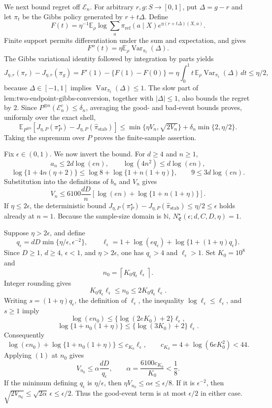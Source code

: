 We next bound regret off \(\mathcal E_n\). For arbitrary \(r,g:S\to[0,1]\), put \(\Delta=g-r\) and let \(\pi_t\) be the Gibbs policy generated by \(r+t\Delta\). Define
\[
F(t)=\eta^{-1}\mathbb E_\rho\log\sum_a\pi_{\mathrm{ref}}(a\mid X)e^{\eta(r+t\Delta)(X,a)}.
\]
Finite support permits differentiation under the sum and expectation, and gives
\[
F''(t)=\eta\mathbb E_\rho\operatorname{Var}_{\pi_t}(\Delta).
\]
The Gibbs variational identity followed by integration by parts yields
\[
J_{\eta,r}(\pi_r)-J_{\eta,r}(\pi_g)
=F'(1)-\{F(1)-F(0)\}
=\eta\int_0^1t\,\mathbb E_\rho\operatorname{Var}_{\pi_t}(\Delta)\,dt
\le\eta/2,
\]
because \(\Delta\in[-1,1]\) implies \(\operatorname{Var}_{\pi_t}(\Delta)\le1\). The slow part of \(\text{lem:two-endpoint-gibbs-conversion}\), together with \(|\Delta|\le1\), also bounds the regret by \(2\). Since \(P^{\otimes n}(\mathcal E_n^c)\le\delta_n\), averaging the good- and bad-event bounds proves, uniformly over the exact shell,
\[
\mathbb E_{P^{\otimes n}}\left[J_{\eta,P}(\pi_P^\star)-J_{\eta,P}(\widehat\pi_{\mathrm{stab}})\right]
\le\min\{\eta V_n,\sqrt{2V_n}\}
+\delta_n\min\{2,\eta/2\}.
\]
Taking the supremum over \(P\) proves the finite-sample assertion.

Fix \(\epsilon\in(0,1)\). We now invert the bound. For \(d\ge4\) and \(n\ge1\),
\[
a_n\le2d\log(en),
\qquad
\log(4n^2)\le d\log(en),
\]
\[
\log\{1+4n(\eta+2)\}
\le\log8+\log\{1+n(1+\eta)\},
\qquad
9\le3d\log(en).
\]
Substitution into the definitions of \(b_n\) and \(V_n\) gives
\[
V_n
\le6100\frac{dD}{n}
\left[\log(en)+\log\{1+n(1+\eta)\}\right].
\tag{1}
\]
If \(\eta\le2\epsilon\), the deterministic bound \(J_{\eta,P}(\pi_P^\star)-J_{\eta,P}(\widehat\pi_{\mathrm{stab}})\le\eta/2\le\epsilon\) holds already at \(n=1\). Because the sample-size domain is \(\mathbb N\), \(N^\star_{\mathfrak E}(\epsilon;d,C,D,\eta)=1\).

Suppose \(\eta>2\epsilon\), and define
\[
q_\epsilon=dD\min\{\eta/\epsilon,\epsilon^{-2}\},
\qquad
\ell_\epsilon=1+\log(eq_\epsilon)+\log\{1+(1+\eta)q_\epsilon\}.
\]
Since \(D\ge1\), \(d\ge4\), \(\epsilon<1\), and \(\eta>2\epsilon\), one has \(q_\epsilon>4\) and \(\ell_\epsilon>1\). Set \(K_0=10^8\) and
\[
n_0=\left\lceil K_0q_\epsilon\ell_\epsilon\right\rceil.
\]
Integer rounding gives
\[
K_0q_\epsilon\ell_\epsilon\le n_0\le2K_0q_\epsilon\ell_\epsilon.
\]
Writing \(s=(1+\eta)q_\epsilon\), the definition of \(\ell_\epsilon\), the inequality \(\log\ell_\epsilon\le\ell_\epsilon\), and \(s\ge1\) imply
\[
\log(en_0)\le\{\log(2eK_0)+2\}\ell_\epsilon,
\]
\[
\log\{1+n_0(1+\eta)\}
\le\{\log(3K_0)+2\}\ell_\epsilon.
\]
Consequently
\[
\log(en_0)+\log\{1+n_0(1+\eta)\}
\le c_{K_0}\ell_\epsilon,
\qquad
c_{K_0}=4+\log(6eK_0^2)<44.
\]
Applying \((1)\) at \(n_0\) gives
\[
V_{n_0}\le\alpha\frac{dD}{q_\epsilon},
\qquad
\alpha=\frac{6100c_{K_0}}{K_0}<\frac18.
\]
If the minimum defining \(q_\epsilon\) is \(\eta/\epsilon\), then \(\eta V_{n_0}\le\alpha\epsilon\le\epsilon/8\). If it is \(\epsilon^{-2}\), then \(\sqrt{2V_{n_0}}\le\sqrt{2\alpha}\,\epsilon\le\epsilon/2\). Thus the good-event term is at most \(\epsilon/2\) in either case.


